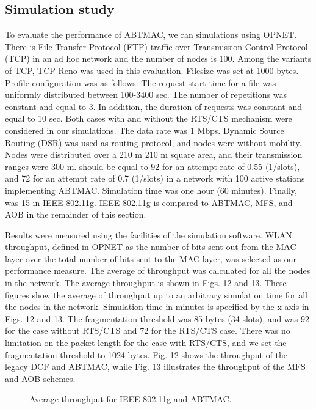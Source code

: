 \documentclass[10pt,twocolumn,oneside,submit]{JCNtran}
\begin{document}
\subsection{Simulation study}
\par To evaluate the performance of ABTMAC, we ran simulations using OPNET. There is File Transfer Protocol (FTP) traffic over Transmission Control Protocol (TCP) in an ad hoc network and the number of nodes is 100. Among the variants of TCP, TCP Reno was used in this evaluation. Filesize was set at 1000 bytes. Profile configuration was as follows: The request start time for a file was uniformly distributed between 100-3400 sec. The number of repetitions was constant and equal to 3. In addition, the duration of requests was constant and equal to 10 sec. Both cases with and without the RTS/CTS mechanism were considered in our simulations. The data rate was 1 Mbps. Dynamic Source Routing (DSR) was used as routing protocol, and nodes were without mobility. Nodes were distributed over a 210 m  210 m square area, and their transmission ranges were 300 m.  should be equal to 92 for an attempt rate of 0.55 (1/slots), and 72 for an attempt rate of 0.7 (1/slots) in a network with 100 active stations implementing ABTMAC. Simulation time was one hour (60 minutes). Finally,  was 15 in IEEE 802.11g. IEEE 802.11g is compared to ABTMAC, MFS, and AOB in the remainder of this section.
\par Results were measured using the facilities of the simulation software. WLAN throughput, defined in OPNET as the number of bits sent out from the MAC layer over the total number of bits sent to the MAC layer, was selected as our performance measure. The average of throughput was calculated for all the nodes in the network. The average throughput is shown in Figs. 12 and 13. These figures show the average of throughput up to an arbitrary simulation time for all the nodes in the network. Simulation time in minutes is specified by the x-axis in Figs. 12 and 13. The fragmentation threshold was 85 bytes (34 slots), and  was 92 for the case without RTS/CTS and 72 for the RTS/CTS case. There was no limitation on the packet length for the case with RTS/CTS, and we set the fragmentation threshold to 1024 bytes. Fig. 12 shows the throughput of the legacy DCF and ABTMAC, while Fig. 13 illustrates the throughput of the MFS and AOB schemes.
\begin{figure}[!t]
\begin{center}
\epsfxsize=8cm \leavevmode{} \caption{Average throughput for IEEE 802.11g and ABTMAC.} \label{fig:12}
\end{center}
\end{figure}
\end{document}
